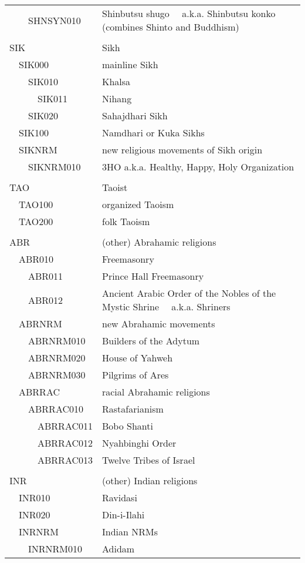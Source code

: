 \documentclass[12pt]{article}
\begin{document}
\begin{tiny}
\begin{center}
\begin{longtable}{|l|l|}
~~~~SHNSYN010 & Shinbutsu shugo	~~a.k.a. Shinbutsu konko (combines Shinto and Buddhism) \\
 \\
{\normalsize SIK } & {\normalsize Sikh } \\
~~SIK000 & mainline Sikh \\
~~~~SIK010 & Khalsa \\
~~~~~~SIK011 & Nihang \\
~~~~SIK020 & Sahajdhari Sikh \\
~~SIK100 & Namdhari or Kuka Sikhs \\
~~SIKNRM & new religious movements of Sikh origin \\
~~~~SIKNRM010 & 3HO a.k.a. Healthy, Happy, Holy Organization \\
 \\
{\normalsize TAO } & {\normalsize Taoist } \\
~~TAO100 & organized Taoism \\
~~TAO200 & folk Taoism \\
 \\
{\normalsize ABR } & {\normalsize (other) Abrahamic religions } \\
~~ABR010 & Freemasonry \\
~~~~ABR011 & Prince Hall Freemasonry \\
~~~~ABR012 & Ancient Arabic Order of the Nobles of the Mystic Shrine	~~a.k.a. Shriners \\
~~ABRNRM & new Abrahamic movements \\
~~~~ABRNRM010 & Builders of the Adytum \\
~~~~ABRNRM020 & House of Yahweh \\
~~~~ABRNRM030 & Pilgrims of Ares \\
~~ABRRAC & racial Abrahamic religions \\
~~~~ABRRAC010 & Rastafarianism \\
~~~~~~ABRRAC011 & Bobo Shanti \\
~~~~~~ABRRAC012 & Nyahbinghi Order \\
~~~~~~ABRRAC013 & Twelve Tribes of Israel \\
 \\
{\normalsize INR } & {\normalsize (other) Indian religions } \\
~~INR010 & Ravidasi \\
~~INR020 & Din-i-Ilahi \\
~~INRNRM & Indian NRMs \\
~~~~INRNRM010 & Adidam \\

\end{longtable}
\end{center}
\end{tiny}
\end{document}
